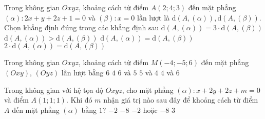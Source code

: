 \begin{ex} %
	Trong không gian $Oxyz$, khoảng cách từ điểm $A(2;4;3)$ đến mặt phẳng $(\alpha)\colon 2x+y+2z+1=0$ và $(\beta)\colon x=0$ lần lượt là $\mathrm{d}(A,(\alpha)), \mathrm{d}(A,(\beta))$. Chọn khẳng định đúng trong các khẳng định sau
	\choice
	{$\mathrm{d}(A,(\alpha))=3\cdot \mathrm{d}(A,(\beta))$}
	{$\mathrm{d}(A,(\alpha))>\mathrm{d}(A,(\beta))$}
	{$\mathrm{d}(A,(\alpha))=\mathrm{d}(A,(\beta))$}
	{\True $2\cdot\mathrm{d}(A,(\alpha))=\mathrm{d}(A,(\beta))$}
\end{ex}
\begin{ex}%
	Trong không gian $Oxyz$, khoảng cách từ điểm $M(-4;-5;6)$ đến mặt phẳng $(Oxy)$, $(Oyz)$ lần lượt bằng
	\choice
	{\True $6$  $4$}   
	{$6$ và $5$}
	{$5$ và $4$}
	{$4$ và $6$}
\end{ex}
\begin{ex}%
	Trong không gian với hệ tọa độ $Oxyz$, cho mặt phẳng $(\alpha)\colon x+2y+2z+m=0$ và điểm $A(1;1;1)$. Khi đó $m$ nhận giá trị nào sau đây để khoảng cách từ điểm $A$ đến mặt phẳng $(\alpha)$ bằng $1$?
	\choice
	{$-2$}
	{$-8$}
	{\True $-2$ hoặc $-8$}
	{$3$}
\end{ex}
